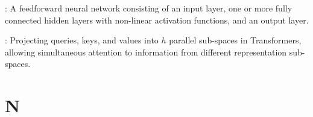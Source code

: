 \begin{description}[leftmargin=!,labelwidth=4.5cm,itemsep=1.5ex]
\item[\textbf{Multilayer Perceptron (MLP)}\hfill \textnormal{\sffamily\scriptsize\color{keyideablue}[Deep Learning]}]: A feedforward neural network consisting of an input layer, one or more fully connected hidden layers with non-linear activation functions, and an output layer.
\item[\textbf{Multi-Head Attention}\hfill \textnormal{\sffamily\scriptsize\color{keyideablue}[Deep Learning]}]: Projecting queries, keys, and values into $h$ parallel sub-spaces in Transformers, allowing simultaneous attention to information from different representation sub-spaces.
\end{description}

\section*{N}
